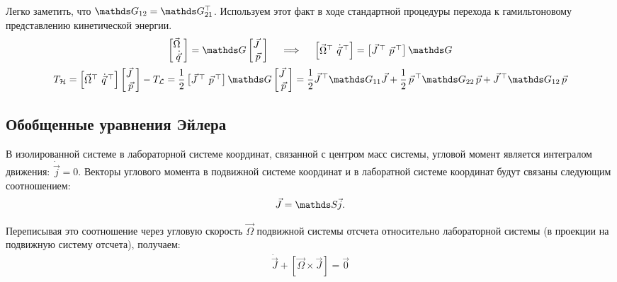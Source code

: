Легко заметить, что $\bbG_{12} = \bbG_{21}^{\top}$. Используем этот факт в ходе стандартной процедуры перехода к гамильтоновому представлению кинетической энергии.
\vverh
\begin{gather}
\begin{bmatrix}
\vec{\Omega} \ \\
\dot{\vec{q}} 
\end{bmatrix}
= \bbG
\begin{bmatrix}
\vec{J} \ \\
\vec{p}
\end{bmatrix}
\quad \implies \quad
\begin{bmatrix}
\vec{\Omega}^{\top} \ \dot{\vec{q}}^{\, \top}
\end{bmatrix}
= 
\begin{bmatrix}
\vec{J}^{\, \top} \ \vec{p}^{\, \top}
\end{bmatrix}
\bbG \notag \\
T_\mathcal{H} = 
\begin{bmatrix}
\vec{\Omega}^{\top} \ \dot{\vec{q}}^{\, \top}
\end{bmatrix}
\begin{bmatrix}
\vec{J} \ \\
\vec{p}
\end{bmatrix} 
- T_\mathcal{L} = \frac{1}{2} 
\begin{bmatrix}
\vec{J}^{\, \top} \ \vec{p}^{\, \top}
\end{bmatrix} 
\bbG
\begin{bmatrix}
\vec{J} \ \\
\vec{p}
\end{bmatrix} = 
\frac{1}{2} \vec{J}^{\, \top} \bbG_{11} \vec{J} + \frac{1}{2} \, \vec{p}^{\, \top} \bbG_{22} \, \vec{p} + \vec{J}^{\, \top} \bbG_{12} \, \vec{p} \notag
\end{gather}

\subsection{Обобщенные уравнения Эйлера}
В изолированной системе в лабораторной системе координат, связанной с центром масс системы, угловой момент является интегралом движения: $\dot{\vec{j}} = 0$. Векторы углового момента в подвижной системе координат и в лаборатной системе координат будут связаны следующим соотношением: 
\vverh
\begin{gather}
\vec{J} = \bbS \vec{j}. \label{j1}
\end{gather} 

Переписывая это соотношение через угловую скорость $\vec{\Omega}$ подвижной системы отсчета относительно лабораторной системы (в проекции на подвижную систему отсчета), получаем:
\vverh
\begin{gather}
\dot{\vec{J}} + \left[ \vec{\Omega} \times \vec{J} \right] = \vec{0} \label{j2}
\end{gather}

